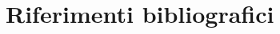 \documentclass[9pt,twocolumn,twoside]{osajnl}
\begin{document}
\section{Riferimenti bibliografici}










% 
% 

  


  
\end{document}
